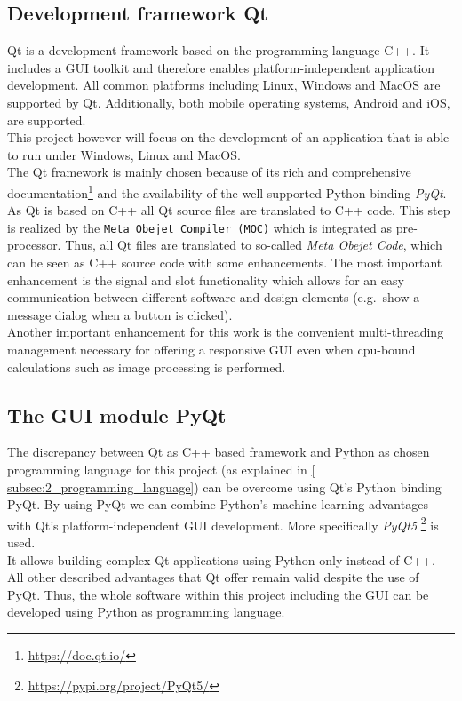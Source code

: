 \subsection{Development framework Qt}\label{subsec:2_qt}
Qt is a development framework based on the programming language C++.
It includes a \ac{GUI} toolkit and therefore enables platform-independent
application development.
All common platforms including Linux, Windows and MacOS are supported by 
Qt.
Additionally, both mobile operating systems, Android and iOS, are supported.\\
This project however will focus on the development of an application that is 
able to run under Windows, Linux and MacOS.\\
The Qt framework is mainly chosen because of its rich and comprehensive 
documentation\footnote{\url{https://doc.qt.io/}} and the availability of the 
well-supported Python binding \textit{PyQt}.\\
As Qt is based on C++ all Qt source files are translated to C++ code.
This step is realized by the \texttt{Meta Obejet Compiler (MOC)} which is 
integrated as pre-processor.
Thus, all Qt files are translated to so-called \textit{Meta Obejet Code}, 
which can be seen as C++ source code with some enhancements.
The most important enhancement is the signal and slot functionality which 
allows for an easy communication between different software and design 
elements (e.g.\ show a message dialog when a button is clicked).\\
Another important enhancement for this work is the convenient multi-threading
management necessary for offering a responsive \ac{GUI} even when cpu-bound 
calculations such as image processing is performed.

\subsection*{The \acs*{GUI} module PyQt}\label{subsec:2_pyqt}
The discrepancy between Qt as C++ based framework and Python as chosen
programming language for this project (as explained in \autoref{
subsec:2_programming_language}) can be overcome using Qt's Python binding PyQt.
By using PyQt we can combine Python's machine learning advantages with Qt's 
platform-independent \ac{GUI} development.
More specifically \textit{PyQt5} \footnote{\url{https://pypi.org/project/PyQt5/}} 
is used.\\
It allows building complex Qt applications using Python only instead of C++.
All other described advantages that Qt offer remain valid despite the use 
of PyQt.
Thus, the whole software within this project including the \ac{GUI} can be 
developed using Python as programming language.